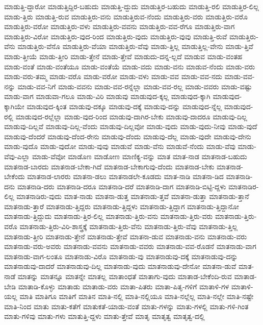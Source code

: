{ಮಾಡುತ್ತಿ-ದ್ದಾರೋ
ಮಾಡುತ್ತಿದ್ದಿರ-ಬಹುದು
ಮಾಡುತ್ತಿ-ದ್ದುದು
ಮಾಡುತ್ತಿರ-ಬಹುದು
ಮಾಡುತ್ತಿ-ರಲಿ
ಮಾಡುತ್ತಿರ-ಲಿಲ್ಲ
ಮಾಡು-ತ್ತಿರು
ಮಾಡುತ್ತಿ-ರುವ
ಮಾಡುತ್ತಿರು-ವನು
ಮಾಡುತ್ತಿರುವ-ನೆಂದು
ಮಾಡುತ್ತಿರು-ವರು
ಮಾಡುತ್ತಿರು-ವರೊ
ಮಾಡುತ್ತಿರು-ವರೋ
ಮಾಡುತ್ತಿರು-ವಳು
ಮಾಡುತ್ತಿರು-ವವನು
ಮಾಡುತ್ತಿರು-ವವ-ರೆಗೂ
ಮಾಡುತ್ತಿರು-ವಾಗ
ಮಾಡುತ್ತಿರು-ವಿರೋ
ಮಾಡುತ್ತಿರು-ವುದ-ರಿಂದ
ಮಾಡುತ್ತಿರು-ವುದು
ಮಾಡುತ್ತಿರು-ವುವು
ಮಾಡುತ್ತಿ-ರುವೆ
ಮಾಡುತ್ತಿರು-ವೆನು
ಮಾಡುತ್ತಿರು-ವೆನೊ
ಮಾಡುತ್ತಿರು-ವೆಯಾ
ಮಾಡುತ್ತಿರು-ವೆವು
ಮಾಡು-ತ್ತಿಲ್ಲ
ಮಾಡುತ್ತಿಲ್ಲ-ವೇನು
ಮಾಡು-ತ್ತಿವೆ
ಮಾಡು-ತ್ತೀಯೆ
ಮಾಡು-ತ್ತೀರಿ
ಮಾಡು-ತ್ತೇನೆ
ಮಾಡು-ತ್ತೇವೆ
ಮಾಡುದು-ದನ್ನ-ಲ್ಲದೆ
ಮಾಡುವ
ಮಾಡು-ವಂತಹ
ಮಾಡು-ವಂತೆ
ಮಾಡು-ವಂತೆಯೂ
ಮಾಡು-ವಂತೆಯೆ
ಮಾಡು-ವದು
ಮಾಡು-ವನು
ಮಾಡುವ-ನೆಂದು
ಮಾಡು-ವರು
ಮಾಡು-ವರು-ತಮ್ಮ
ಮಾಡು-ವರೊ
ಮಾಡು-ವರೋ
ಮಾಡು-ವಳು
ಮಾಡು-ವವ
ಮಾಡು-ವವ-ನದು
ಮಾಡು-ವವ-ನನ್ನು
ಮಾಡು-ವವ-ನಿಗೆ
ಮಾಡು-ವವನು
ಮಾಡು-ವವ-ರನ್ನೆಲ್ಲಾ
ಮಾಡು-ವವ-ರಲ್ಲ
ಮಾಡು-ವವರು
ಮಾಡು-ವಷ್ಟು
ಮಾಡು-ವಾಗ
ಮಾಡುವಾ-ಗಲೂ
ಮಾಡು-ವಿರಿ
ಮಾಡುವು
ಮಾಡುವುದ-ಕ್ಕಲ್ಲ
ಮಾಡುವುದ-ಕ್ಕಾಗಿ
ಮಾಡುವುದ-ಕ್ಕಾಗಿಯೇ
ಮಾಡುವುದ-ಕ್ಕಿಂತ
ಮಾಡುವು-ದಕ್ಕೂ
ಮಾಡುವು-ದಕ್ಕೆ
ಮಾಡುವು-ದನ್ನು
ಮಾಡುವುದ-ನ್ನೆಲ್ಲ
ಮಾಡುವುದ-ರಲ್ಲಿ
ಮಾಡುವುದ-ರಲ್ಲೆಲ್ಲಾ
ಮಾಡು-ವುದ-ರಿಂದ
ಮಾಡುವು-ದಾಗಿರ-ಬೇಕು
ಮಾಡುವು-ದಾದರೂ
ಮಾಡುವು-ದಿಲ್ಲ
ಮಾಡುವು-ದಿಲ್ಲವೆ
ಮಾಡುವು-ದಿಲ್ಲ-ವೆಂದು
ಮಾಡುವು-ದಿಲ್ಲವೋ
ಮಾಡು-ವುದು
ಮಾಡು-ವುದು-ನೀವು
ಮಾಡು-ವುದೆ
ಮಾಡುವು-ದೆಂದರೆ
ಮಾಡುವು-ದೆಂದ-ರೇನು
ಮಾಡುವು-ದೆಂದು
ಮಾಡುವು-ದೆಲ್ಲ
ಮಾಡು-ವುದೇ
ಮಾಡುವು-ದೇನು
ಮಾಡು-ವುದೊ
ಮಾಡು-ವುದೋ
ಮಾಡು-ವುವು
ಮಾಡುವೆ
ಮಾಡು-ವೆನು
ಮಾಡುವೆ-ನೆಂದು
ಮಾಡು-ವೆವು
ಮಾಡು-ವೆವು-ಎಲ್ಲಾ
ಮಾಡು-ವೆವೋ
ಮಾಡೊಣ
ಮಾಡೋಣ
ಮಾಣಿಕ್ಯ-ವನ್ನು
ಮಾತ
ಮಾತ-ನಾಡ
ಮಾತನಾಡ-ಬಹುದು
ಮಾತನಾಡ-ಬಾರದು
ಮಾತನಾಡ-ಬೇಕಾ-ಗಿದೆ
ಮಾತನಾಡ-ಬೇಕಾಗುವು-ದೆಂದು
ಮಾತನಾಡ-ಬೇಕು
ಮಾತನಾಡ-ಬೇಕೆಂದು
ಮಾತನಾಡ-ಲಾರರು
ಮಾತನಾ-ಡಲು
ಮಾತನಾಡಲೇ-ಕೂಡದು
ಮಾತ-ನಾಡಿ
ಮಾತನಾ-ಡಿದ
ಮಾತನಾಡಿ-ದನು
ಮಾತನಾಡಿ-ದರು
ಮಾತನಾಡಿ-ದರೂ
ಮಾತನಾಡಿ-ದರೆ
ಮಾತನಾಡಿ-ದಾಗ
ಮಾತನಾಡಿ-ಬಿಟ್ಟಿ-ದ್ದಳು
ಮಾತನಾಡಿರ-ಲಿಲ್ಲ
ಮಾತನಾಡಿರು-ವುದು
ಮಾತ-ನಾಡು
ಮಾತನಾ-ಡುತ್ತ
ಮಾತನಾಡು-ತ್ತವೆ
ಮಾತನಾ-ಡುತ್ತಾ
ಮಾತನಾಡು-ತ್ತಾನೆ
ಮಾತನಾಡು-ತ್ತಾರೆ
ಮಾತನಾಡು-ತ್ತಿದ್ದರು
ಮಾತನಾಡು-ತ್ತಿದ್ದಳು
ಮಾತನಾಡು-ತ್ತಿದ್ದಾಗ
ಮಾತನಾಡು-ತ್ತಿದ್ದಾನೋ
ಮಾತನಾಡು-ತ್ತಿದ್ದುದು
ಮಾತನಾಡು-ತ್ತಿರ-ಲಿಲ್ಲ
ಮಾತನಾಡು-ತ್ತಿರು-ವನು
ಮಾತನಾಡು-ತ್ತಿರು-ವರು
ಮಾತನಾಡು-ತ್ತಿರು-ವರೊ
ಮಾತನಾಡು-ತ್ತಿರು-ವಿರಿ-ಶಾಸ್ತ್ರಕ್ಕೆ
ಮಾತನಾಡು-ತ್ತಿರು-ವೆನು
ಮಾತನಾಡು-ತ್ತಿರು-ವೆವು
ಮಾತನಾಡು-ತ್ತಿಲ್ಲ
ಮಾತನಾಡು-ತ್ತೀರಿ
ಮಾತನಾಡು-ತ್ತೇನೆ
ಮಾತನಾಡು-ತ್ತೇವೆ
ಮಾತನಾ-ಡುವ
ಮಾತನಾಡು-ವನು
ಮಾತನಾಡು-ವರು
ಮಾತನಾಡು-ವರು-ಅವರು
ಮಾತನಾಡು-ವವನು
ಮಾತನಾಡು-ವವರು
ಮಾತನಾಡು-ವವ-ರೊಡನೆ
ಮಾತನಾಡು-ವಾಗ
ಮಾತನಾಡು-ವಾಗ-ಲಂತೂ
ಮಾತನಾಡು-ವಿರೊ
ಮಾತನಾಡು-ವು
ಮಾತನಾಡುವು-ದಕ್ಕೆ
ಮಾತನಾಡುವು-ದನ್ನು
ಮಾತನಾಡುವು-ದಾದರೆ
ಮಾತನಾಡುವು-ದಿಲ್ಲ
ಮಾತನಾಡು-ವುದು
ಮಾತನಾಡುವು-ದೇನೋ
ಮಾತನಾ-ಡುವೆ
ಮಾತ-ನಾಡೆ
ಮಾತನ್ನು
ಮಾತನ್ನೂ
ಮಾತನ್ನೇ
ಮಾತಲ್ಲ
ಮಾತಾಂಧತೆ
ಮಾತಾಗು-ವುದು
ಮಾತಾಡ-ಬೇಕೆಂದಿ-ರುವ
ಮಾತಾಡ-ಬೇಡಿ
ಮಾತಾಡಿ-ಕೊಳ್ಳು
ಮಾತಾಡು
ಮಾತಾಡು-ವರು
ಮಾತಾ-ಪಿತರು
ಮಾತಾ-ಪಿತೃ-ಗಳಿಗೆ
ಮಾತಾಳಿ-ಗಳ
ಮಾತಾಳಿ-ಯಲ್ಲ
ಮಾತಿ
ಮಾತಿಗೂ
ಮಾತಿಗೆ
ಮಾತಿನ
ಮಾತಿ-ನಲ್ಲಿ
ಮಾತಿ-ನಲ್ಲಿಯೂ
ಮಾತಿ-ನಲ್ಲೆಲ್ಲ
ಮಾತಿ-ನಲ್ಲೇ
ಮಾತಿ-ನಷ್ಟೇ
ಮಾತಿ-ನಿಂದ
ಮಾತು
ಮಾತು-ಕತೆಗೆ
ಮಾತುಕತೆ-ಯಾಡು-ವಂತೆ
ಮಾತು-ಗಳನ್ನು
ಮಾತು-ಗಳಲ್ಲಿ
ಮಾತು-ಗಳಿ-ಗಿಂತ
ಮಾತು-ಗಳಿವು
ಮಾತು-ಗಳು
ಮಾತುತ್ತಿ-ದ್ದಳು
ಮಾತು-ತ್ತೇವೆ
ಮಾತೃ
ಮಾತೃತ್ವ
ಮಾತೃತ್ವ-ದಲ್ಲಿ
}
